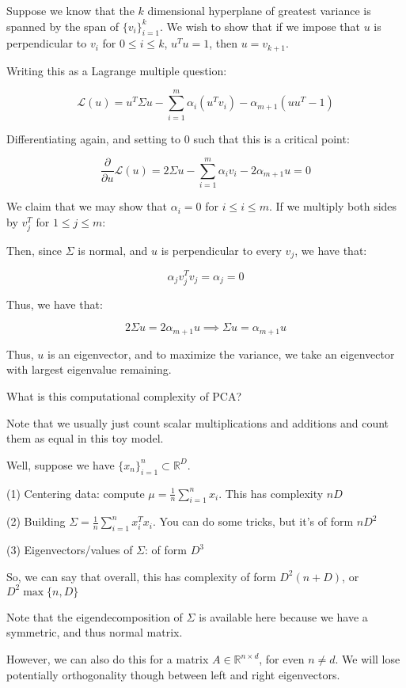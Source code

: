 \documentclass[10pt]{article}
\begin{document}
Suppose we know that the $k$ dimensional hyperplane of greatest variance is spanned by the span of $\{ v_i \}_{i=1}^k$. We wish to show that if we impose that $u$ is perpendicular to $v_i$ for $0 \leq i \leq k$, $u^T u = 1$, then $u = v_{k+1}$.

Writing this as a Lagrange multiple question:

$$ \mathcal{L}(u) = u^T \Sigma u - \sum_{i=1}^m \alpha_i (u^T v_i)  - \alpha_{m+1} ( u u^T - 1) $$

Differentiating again, and setting to $0$ such that this is a critical point:

$$ \frac{\partial}{\partial u} \mathcal{L}(u) = 2\Sigma u - \sum_{i=1}^m \alpha_i v_i  - 2\alpha_{m+1} u = 0$$

We claim that we may show that $\alpha_i = 0$ for $i \leq i \leq m$. If we multiply both sides by $v_j^T$ for $1 \leq j \leq m$:

Then, since $\Sigma$ is normal, and $u$ is perpendicular to every $v_j$, we have that:

$$\alpha_j v_j^T v_j = \alpha_j = 0$$

Thus, we have that:

$$ 2 \Sigma u = 2 \alpha_{m+1} u \implies \Sigma u = \alpha_{m+1} u$$

Thus, $u$ is an eigenvector, and to maximize the variance, we take an eigenvector with largest eigenvalue remaining.

What is this computational complexity of PCA?

Note that we usually just count scalar multiplications and additions and count them as equal in this toy model.

Well, suppose we have $\{ x_n \}_{i=1}^n \subset \mathbb{R}^D$.

(1) Centering data: compute $\mu = \frac{1}{n} \sum_{i=1}^n x_i$. This has complexity $nD$

(2) Building $\Sigma = \frac{1}{n} \sum_{i=1}^n x_i^T x_i$. You can do some tricks, but it’s of form $nD^2$

(3) Eigenvectors/values of $\Sigma$: of form $D^3$

So, we can say that overall, this has complexity of form $D^2 ( n + D)$, or $D^2 \max\{ n, D \}$

Note that the eigendecomposition of $\Sigma$ is available here because we have a symmetric, and thus normal matrix. 

However, we can also do this for a matrix $A \in \mathbb{R}^{n \times d}$, for even $n \not = d$. We will lose potentially orthogonality though between left and right eigenvectors.
\end{document}
